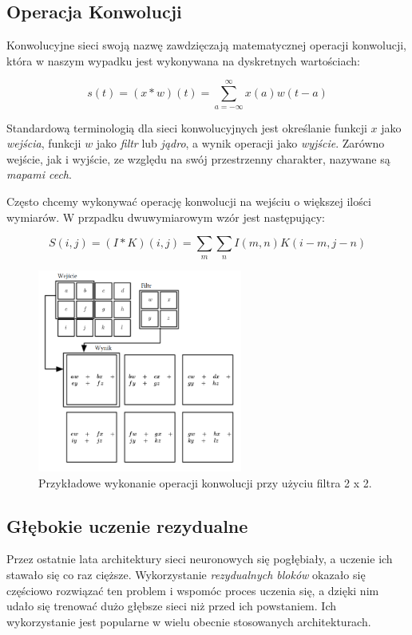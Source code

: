 \documentclass[licencjacka]{pracamgr}
\begin{document}
\subsection{Operacja Konwolucji}

Konwolucyjne sieci swoją nazwę zawdzięczają matematycznej operacji konwolucji, która w naszym wypadku jest wykonywana na dyskretnych wartościach:

$$ s(t) = (x * w)(t) = \sum_{a = -\infty}^{\infty} x(a)w(t - a) $$

Standardową terminologią dla sieci konwolucyjnych jest określanie funkcji $x$ jako \emph{wejścia}, funkcji $w$ jako \emph{filtr} lub \emph{jądro}, a wynik operacji jako \emph{wyjście}. Zarówno wejście, jak i wyjście, ze względu na swój przestrzenny charakter, nazywane są \emph{mapami cech}.

Często chcemy wykonywać operację konwolucji na wejściu o większej ilości wymiarów. W przpadku dwuwymiarowym wzór jest następujący:

$$ S(i, j) = (I * K)(i, j) = \sum_m \sum_n I(m, n) K(i - m, j - n) $$


\begin{figure}[ht!]
  \centering
  \includegraphics[width=0.6\textwidth]{konwolucja}
  \caption{Przykładowe wykonanie operacji konwolucji przy użyciu filtra 2 x 2. \cite{dlbook}}
\end{figure}

\subsection{Głębokie uczenie rezydualne}

Przez ostatnie lata architektury sieci neuronowych się pogłębiały, a uczenie ich stawało się co raz cięższe. Wykorzystanie \emph{rezydualnych bloków} \cite{resnet} okazało się częściowo rozwiązać ten problem i wspomóc proces uczenia się, a dzięki nim udało się trenować dużo głębsze sieci niż przed ich powstaniem. Ich wykorzystanie jest popularne w wielu obecnie stosowanych architekturach.
\end{document}
